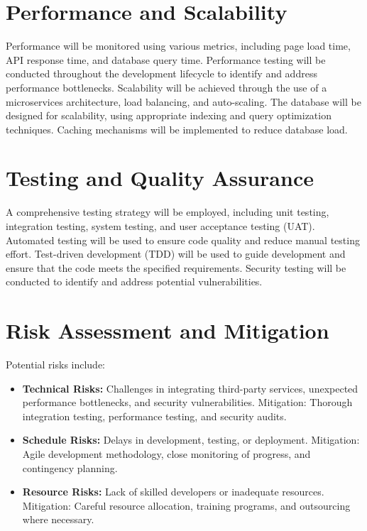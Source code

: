 \documentclass[11pt,a4paper,oneside]{article}
\begin{document}
\section{Performance and Scalability}

Performance will be monitored using various metrics, including page load time, API response time, and database query time.  Performance testing will be conducted throughout the development lifecycle to identify and address performance bottlenecks.  Scalability will be achieved through the use of a microservices architecture, load balancing, and auto-scaling.  The database will be designed for scalability, using appropriate indexing and query optimization techniques.  Caching mechanisms will be implemented to reduce database load.

\section{Testing and Quality Assurance}

A comprehensive testing strategy will be employed, including unit testing, integration testing, system testing, and user acceptance testing (UAT).  Automated testing will be used to ensure code quality and reduce manual testing effort.  Test-driven development (TDD) will be used to guide development and ensure that the code meets the specified requirements.  Security testing will be conducted to identify and address potential vulnerabilities.

\section{Risk Assessment and Mitigation}

Potential risks include:

\begin{itemize}
    \item \textbf{Technical Risks:}  Challenges in integrating third-party services, unexpected performance bottlenecks, and security vulnerabilities.  Mitigation:  Thorough integration testing, performance testing, and security audits.
    \item \textbf{Schedule Risks:} Delays in development, testing, or deployment.  Mitigation:  Agile development methodology, close monitoring of progress, and contingency planning.
    \item \textbf{Resource Risks:}  Lack of skilled developers or inadequate resources.  Mitigation:  Careful resource allocation, training programs, and outsourcing where necessary.
\end{itemize}
\end{document}
